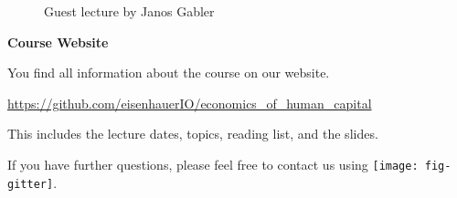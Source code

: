 \begin{frame}
	\begin{figure}
		\caption{Guest lecture by Janos Gabler}
		\centering{}
	\end{figure}
\end{frame}

\begin{frame}
	\textbf{Course Website}\vspace{0.3cm}

You find all information about the course on our website.

\begin{center}
\url{https://github.com/eisenhauerIO/economics_of_human_capital}
\end{center}

This includes the lecture dates, topics, reading list, and the slides.\vspace{0.3cm}

If you have further questions, please feel free to contact us using
\texttt{[image: fig-gitter]}.

\end{frame}
